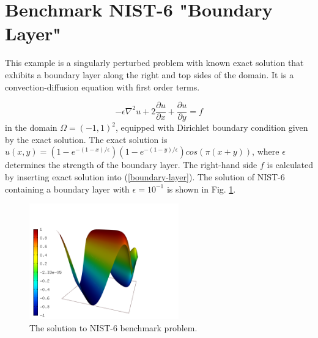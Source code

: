 \section{Benchmark NIST-6 "Boundary Layer"}
\label{sec:bench-6}

This example is a singularly perturbed problem with known exact solution that exhibits
a boundary layer along the right and top sides of the domain.
It is a convection-diffusion equation with first order terms.

\begin{equation} \label{boundary-layer}
-\epsilon \nabla^{2} u + 2\frac{\partial u}{\partial x} + \frac{\partial u}{\partial y} = f
\end{equation}
in the domain $\Omega = (-1, 1)^2$, equipped with Dirichlet boundary condition
given by the exact solution. The exact solution is
$u(x,y) = (1 - e^{-(1 - x) / \epsilon})(1 - e^{-(1 - y) / \epsilon})cos(\pi (x + y))$,
where $\epsilon$ determines the strength of the boundary layer.
The right-hand side $f$ is calculated by inserting exact solution into (\ref{boundary-layer}).
The solution of NIST-6 containing a boundary layer
with $\epsilon = 10^{-1}$ is shown in Fig. \ref{fig:sln-nist06}.

\begin{figure}[!ht]
\centering
\includegraphics[height=5cm]{nist/nist-6/solution.png}
\caption{The solution to NIST-6 benchmark problem.}
\label{fig:sln-nist06}
\end{figure}

